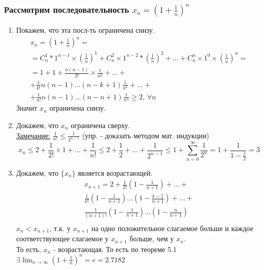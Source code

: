 \documentclass[12pt]{article}
\begin{document}
    \subsubsection*{Рассмотрим последовательность $x_n = (1+\frac{1}{n})^n$}
    \begin{enumerate}
        \item Покажем, что эта посл-ть ограничена снизу.
        \begin{gather*}
            x_n = (1 + \frac{1}{n})^n =\\
            = C^{1}_{n}*1^{n-1}\times(\frac{1}{n})^{1} + C^{2}_{n}\times1^{n-2}*(\frac{1}{n})^{2} + \dots + C^n_{n}\times1^{0}\times(\frac{1}{n})^n =\\
            = 1 + 1 + \frac{n(n-1)}{2!} \times \frac{1}{n^{2}} + \dots +\\
            + \frac{1}{k!}n(n-1)\dots(n-k+1)\frac{1}{n^{k}}+\dots+\\
            +\frac{1}{n!}n(n-1)\dots(n-n+1)\frac{1}{n^n} \ge 2 \text{, } \forall n
        \end{gather*}
        Значит $x_n$ ограничена снизу.
        \item Докажем, что $x_n$ ограничена сверху.\\
        \underline{Замечание:} $\frac{1}{n!} \le \frac{1}{2^{n-1}}$ (упр. - доказать методом мат. индукции)
        \begin{equation*}
            x_n \le 2 + \frac{1}{2!} \times 1 + \dots + \frac{1}{n!} \le 2 + \frac{1}{2} + \dots + \frac{1}{2^{n-1}} \le 1 + \sum_{n=0}^{\infty} \frac{1}{2^n} = 1 + \frac{1}{1-\frac{1}{2}} = 3
        \end{equation*}
        \item Докажем, что $\{x_n\}$ является возрастающей.\\
        \begin{gather*}
            x_{n+1} = 2 + \frac{1}{2!} (1 - \frac{1}{n+1}) + \dots +\\
            \frac{1}{k!} (1 - \frac{1}{n+1}) \dots (1 - \frac{k-1}{n+1}) + \dots +\\
            \frac{1}{(n+1)!} (1 - \frac{1}{n+1}) \dots (1 - \frac{n}{n+1})\\
        \end{gather*}
        $x_n < x_{n+1}$, т.к. у $x_{n+1}$ на одно положительное слагаемое больше и каждое соответствующее слагаемое у $x_{n+1}$ больше, чем у $x_n$.\\
        \indent То есть, $x_n$ - возрастающая. То есть по теореме 5.1 $\exists \lim_{n\to\infty}(1+\frac{1}{n})^n = e = 2.7182$
    \end{enumerate}
\end{document}
